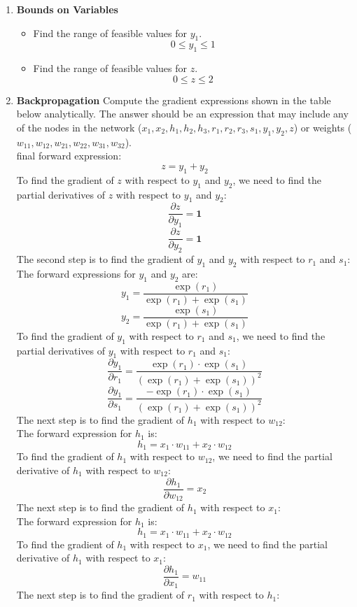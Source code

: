 \documentclass[a3paper,12pt]{extarticle} %
\begin{document}
\begin{enumerate}
\begin{enumerate}
\item \textbf{Bounds on Variables}
\begin{itemize}
    \item Find the range of feasible values for $y_1$.
    \[
    0 \leq y_1 \leq 1
    \]
    \item Find the range of feasible values for $z$.
    \[
    0 \leq z \leq 2
    \]
\end{itemize}

\item \textbf{Backpropagation}
Compute the gradient expressions shown in the table below analytically. The answer should be an expression that may include any of the nodes in the network ($x_1, x_2, h_1, h_2, h_3, r_1, r_2, r_3, s_1, y_1, y_2, z$) or weights ($w_{11}, w_{12}, w_{21}, w_{22}, w_{31}, w_{32}$).
\\ final forward expression:
\[
z = y_1 + y_2
\]
To find the gradient of $z$ with respect to $y_1$ and $y_2$, we need to find the partial derivatives of $z$ with respect to $y_1$ and $y_2$:
\[
\frac{\partial z}{\partial y_1} = \textbf{1}
\]
\[
\frac{\partial z}{\partial y_2} = \textbf{1}
\]
The second step is to find the gradient of $y_1$ and $y_2$ with respect to $r_1$ and $s_1$:
\\ The forward expressions for $y_1$ and $y_2$ are:
\[
y_1 = \frac{\exp(r_1)}{\exp(r_1) + \exp(s_1)}
\]
\[
y_2 = \frac{\exp(s_1)}{\exp(r_1) + \exp(s_1)}
\]
To find the gradient of $y_1$ with respect to $r_1$ and $s_1$, we need to find the partial derivatives of $y_1$ with respect to $r_1$ and $s_1$:
\[
\frac{\partial y_1}{\partial r_1} = \frac{\exp(r_1) \cdot \exp(s_1)}{(\exp(r_1) + \exp(s_1))^2}
\]
\[
\frac{\partial y_1}{\partial s_1} = \frac{-\exp(r_1) \cdot \exp(s_1)}{(\exp(r_1) + \exp(s_1))^2}
\]
The next step is to find the gradient of $h_1$ with respect to $w_{12}$:
\\ The forward expression for $h_1$ is: 
\[
h_1 = x_1 \cdot w_{11} + x_2 \cdot w_{12}
\]
To find the gradient of $h_1$ with respect to $w_{12}$, we need to find the partial derivative of $h_1$ with respect to $w_{12}$:
\[
\frac{\partial h_1}{\partial w_{12}} = x_2
\]
The next step is to find the gradient of $h_1$ with respect to $x_1$:
\\ The forward expression for $h_1$ is:
\[
h_1 = x_1 \cdot w_{11} + x_2 \cdot w_{12}
\]
To find the gradient of $h_1$ with respect to $x_1$, we need to find the partial derivative of $h_1$ with respect to $x_1$:
\[
\frac{\partial h_1}{\partial x_1} = w_{11}
\]
The next step is to find the gradient of $r_1$ with respect to $h_1$:

\end{enumerate}
\end{enumerate}
\end{document}
